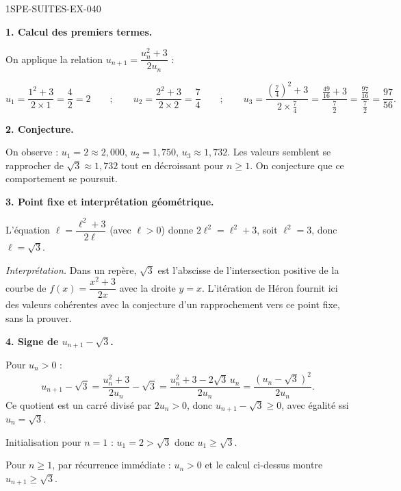\begin{corrige}{1SPE-SUITES-EX-040}

\textbf{1. Calcul des premiers termes.}


On applique la relation $u_{n+1} = \dfrac{u_n^2 + 3}{2u_n}$ :

\[
u_1 = \frac{1^2 + 3}{2 \times 1} = \frac{4}{2} = 2 \qquad ; \qquad
u_2 = \frac{2^2 + 3}{2 \times 2} = \frac{7}{4} \qquad ; \qquad
u_3 = \frac{\left(\frac{7}{4}\right)^2 + 3}{2 \times \frac{7}{4}} = \frac{\frac{49}{16} + 3}{\frac{7}{2}} = \frac{\frac{97}{16}}{\frac{7}{2}} = \frac{97}{56}.
\]

\textbf{2. Conjecture.}

On observe : $u_1 = 2 \approx 2{,}000$, $u_2 = 1{,}750$, $u_3 \approx 1{,}732$. Les valeurs semblent se rapprocher de $\sqrt{3} \approx 1{,}732$ tout en décroissant pour $n \geq 1$. On conjecture que ce comportement se poursuit.

\textbf{3. Point fixe et interprétation géométrique.}


L'équation $\ell = \dfrac{\ell^2 + 3}{2\ell}$ (avec $\ell > 0$) donne $2\ell^2 = \ell^2 + 3$, soit $\ell^2 = 3$, donc $\ell = \sqrt{3}$.

\textit{Interprétation.} Dans un repère, $\sqrt{3}$ est l'abscisse de l'intersection positive de la courbe de $f(x) = \dfrac{x^2+3}{2x}$ avec la droite $y=x$. L'itération de Héron fournit ici des valeurs cohérentes avec la conjecture d'un rapprochement vers ce point fixe, sans la prouver.

\textbf{4. Signe de $u_{n+1} - \sqrt{3}$.}


Pour $u_n > 0$ :
\[
u_{n+1} - \sqrt{3} = \frac{u_n^2 + 3}{2u_n} - \sqrt{3} = \frac{u_n^2 + 3 - 2\sqrt{3}\,u_n}{2u_n} = \frac{(u_n - \sqrt{3})^2}{2u_n}.
\]
Ce quotient est un carré divisé par $2u_n > 0$, donc $u_{n+1} - \sqrt{3} \geq 0$, avec égalité ssi $u_n = \sqrt{3}$.

\medskip
Initialisation pour $n = 1$ : $u_1 = 2 > \sqrt{3}$ donc $u_1 \geq \sqrt{3}$.

Pour $n \geq 1$, par récurrence immédiate : $u_n > 0$ et le calcul ci-dessus montre $u_{n+1} \geq \sqrt{3}$.


\end{corrige}
